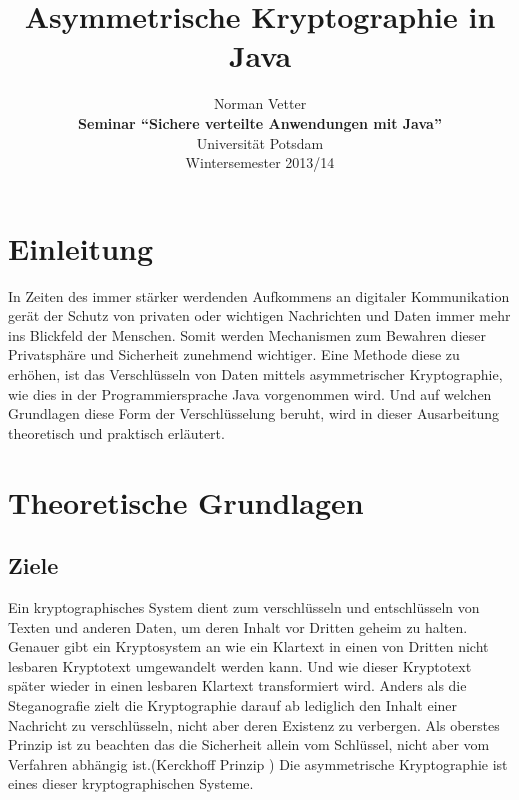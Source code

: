 \documentclass[paper=a4,11pt,german]{scrartcl} %
\begin{document}
%
\title{Asymmetrische Kryptographie in Java}

\author{Norman Vetter\\
\textbf{Seminar "`Sichere verteilte Anwendungen mit Java"'}\\
Universität Potsdam\\
Wintersemester 2013/14}

\date{}

\maketitle

%
\newpage
\tableofcontents
\newpage
\section{Einleitung}

In Zeiten des immer stärker werdenden Aufkommens an digitaler Kommunikation gerät der Schutz von privaten oder wichtigen Nachrichten und Daten immer mehr ins Blickfeld der Menschen. Somit werden Mechanismen zum Bewahren dieser Privatsphäre und Sicherheit zunehmend wichtiger. Eine Methode diese zu erhöhen, ist das Verschlüsseln von Daten mittels asymmetrischer Kryptographie, wie dies in der Programmiersprache Java vorgenommen wird. Und auf welchen Grundlagen diese Form der Verschlüsselung beruht, wird in dieser Ausarbeitung theoretisch und praktisch erläutert.
       
\section{Theoretische Grundlagen}

\subsection{Ziele}
Ein kryptographisches System dient zum verschlüsseln und entschlüsseln von Texten und anderen Daten, um deren Inhalt vor Dritten geheim zu halten. Genauer gibt ein Kryptosystem an wie ein Klartext in einen von Dritten nicht lesbaren Kryptotext umgewandelt werden kann. Und wie dieser Kryptotext später wieder in einen lesbaren Klartext transformiert wird. Anders als die Steganografie zielt die Kryptographie darauf ab lediglich den Inhalt einer Nachricht zu verschlüsseln, nicht aber deren Existenz zu verbergen. Als oberstes Prinzip ist zu beachten das die Sicherheit allein vom Schlüssel, nicht aber vom Verfahren abhängig ist.(Kerckhoff Prinzip \cite{Eckert13}) Die asymmetrische Kryptographie ist eines dieser kryptographischen Systeme.
\end{document}
